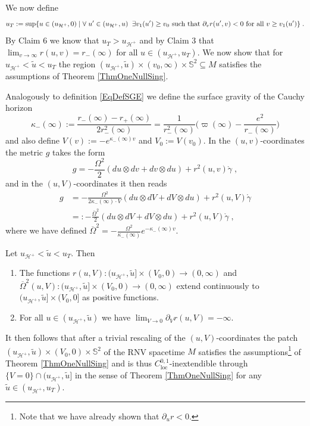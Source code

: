 \documentclass[reqno]{article}
\newcommand{\loc}{\mathrm{loc}}
\newcommand{\uh}{u_{\mathcal{H}^+}}
\newcommand{\rd}{\partial}
\begin{document}
We now define $$u_T := \sup \{ u \in (\uh, 0) \; | \; \forall \;  u' \in (\uh, u)  \; \; \exists v_1(u') \geq v_0 \textnormal{ such that } \rd_v r(u',v) <0 \textnormal{ for all } v \geq v_1(u') \} \;.$$
By Claim 6 we know that $u_T > \uh$ and by Claim 3 that $\lim_{v \to \infty} r(u,v) = r_-(\infty)$ for all $u \in (\uh, u_T)$. We now show that for $\uh < \tilde{u} < u_T$ the region $(\uh, \tilde{u}) \times (v_0, \infty) \times \mathbb{S}^2 \subseteq M$ satisfies the assumptions of Theorem \ref{ThmOneNullSing}.

Analogously to definition \eqref{EqDefSGE} we define the surface gravity of the Cauchy horizon
$$\kappa_-(\infty) := \frac{r_-(\infty) - r_+(\infty)}{2r_-^2(\infty)} = \frac{1}{r_-^2(\infty)}\big(\varpi(\infty) - \frac{e^2}{r_-(\infty)}\big) $$
and also define $V(v) := -e^{\kappa_-(\infty) v}$ and $V_0 := V(v_0)$.
In the $(u,v)$-coordinates the metric $g$ takes the form 
\begin{equation}
\label{EqMetricUV}
g = - \frac{\Omega^2}{2} (du \otimes dv + dv \otimes du) + r^2(u,v) \mathring{\gamma} \;,
\end{equation}
and in the $(u,V)$-coordinates it then reads
\begin{equation*}
\begin{split}
g &= - \frac{\Omega^2}{2 \kappa_-(\infty) \cdot V} (du \otimes dV + dV \otimes du) + r^2(u,V) \mathring{\gamma} \\
&=: - \frac{\overline{\Omega}^2}{2} (du \otimes dV + dV \otimes du) + r^2(u,V) \mathring{\gamma} \;,
\end{split}
\end{equation*}
where we have defined $\overline{\Omega}^2 = - \frac{\Omega^2}{\kappa_-(\infty)} e^{-\kappa_-(\infty) v}$.
\begin{proposition} \label{PropRNV}
Let $\uh < \tilde{u} < u_T$. Then
\begin{enumerate}
\item The functions $r(u,V) : (\uh, \tilde{u}] \times (V_0, 0) \to (0, \infty)$ and $\overline{\Omega}^2(u,V) :  (\uh, \tilde{u}] \times (V_0, 0) \to (0, \infty)$ extend continuously to $ (\uh, \tilde{u}] \times (V_0, 0] $ as positive functions.
\item For all $u \in (\uh, \tilde{u})$ we have $\lim_{V \to 0} \partial_V r (u,V) = -\infty$.
\end{enumerate} 
It then follows that after a trivial rescaling of the $(u,V)$-coordinates the patch $(\uh, \tilde{u}) \times (V_0, 0) \times \mathbb{S}^2 $ of the RNV spacetime $M$ satisfies the assumptions\footnote{Note that we have already shown that $\partial_u r <0$.} of Theorem \ref{ThmOneNullSing} and is thus $C^{0,1}_{\loc}$-inextendible through $\{V=0\} \cap (\uh, \tilde{u}]$ in the sense of Theorem \ref{ThmOneNullSing} for any $\tilde{u} \in (\uh, u_T)$.
\end{proposition}
\end{document}
